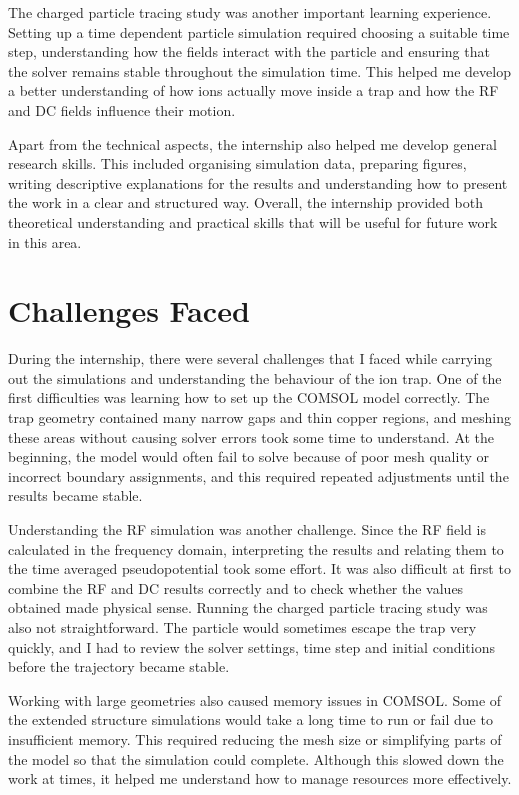 \documentclass[12pt,a4paper]{report}
\begin{document}
The charged particle tracing study was another important learning experience. Setting up a time dependent particle simulation required choosing a suitable time step, understanding how the fields interact with the particle and ensuring that the solver remains stable throughout the simulation time. This helped me develop a better understanding of how ions actually move inside a trap and how the RF and DC fields influence their motion.

Apart from the technical aspects, the internship also helped me develop general research skills. This included organising simulation data, preparing figures, writing descriptive explanations for the results and understanding how to present the work in a clear and structured way. Overall, the internship provided both theoretical understanding and practical skills that will be useful for future work in this area.

\chapter*{Challenges Faced}

During the internship, there were several challenges that I faced while carrying out the simulations and understanding the behaviour of the ion trap. One of the first difficulties was learning how to set up the COMSOL model correctly. The trap geometry contained many narrow gaps and thin copper regions, and meshing these areas without causing solver errors took some time to understand. At the beginning, the model would often fail to solve because of poor mesh quality or incorrect boundary assignments, and this required repeated adjustments until the results became stable.

Understanding the RF simulation was another challenge. Since the RF field is calculated in the frequency domain, interpreting the results and relating them to the time averaged pseudopotential took some effort. It was also difficult at first to combine the RF and DC results correctly and to check whether the values obtained made physical sense. Running the charged particle tracing study was also not straightforward. The particle would sometimes escape the trap very quickly, and I had to review the solver settings, time step and initial conditions before the trajectory became stable.

Working with large geometries also caused memory issues in COMSOL. Some of the extended structure simulations would take a long time to run or fail due to insufficient memory. This required reducing the mesh size or simplifying parts of the model so that the simulation could complete. Although this slowed down the work at times, it helped me understand how to manage resources more effectively.
\end{document}
